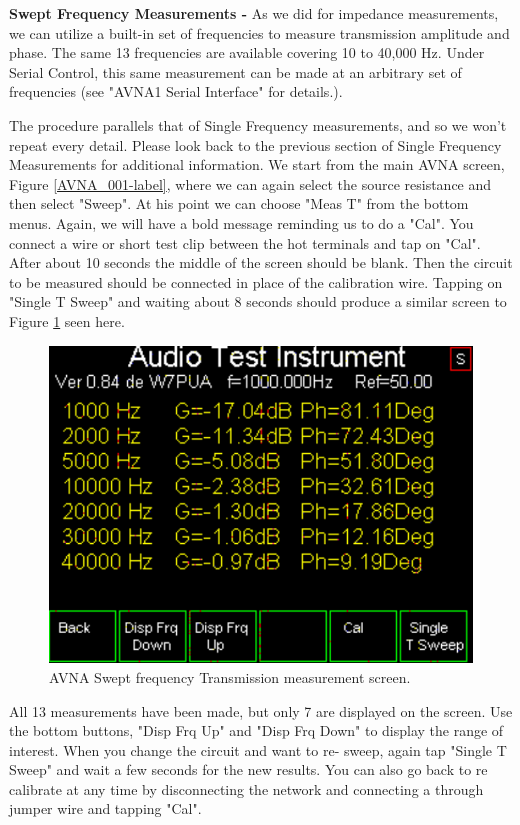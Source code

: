 \textbf{Swept Frequency Measurements - } As we did for impedance measurements, we can utilize a built-in set of frequencies to measure transmission amplitude and phase.  The same 13 frequencies are available covering 10 to 40,000 Hz.  Under Serial Control, this same measurement can be made at an arbitrary set of frequencies (see "AVNA1 Serial Interface" for details.).

The procedure parallels that of Single Frequency measurements, and so we won't repeat every detail.  Please look back to the previous section of Single Frequency Measurements for additional information.  We start from the main AVNA screen, Figure \ref{AVNA_001-label}, where we can again select the source resistance and then select "\textsf{Sweep}".  At his point we can choose "\textsf{Meas T}" from the bottom menus.  Again, we will have a bold message reminding us to do a "\textsf{Cal}".  You connect a wire or short test clip between the hot terminals and tap on "\textsf{Cal}".  After  about 10 seconds the middle of the screen should be blank. Then the circuit to be measured should be connected in place of the calibration wire.  Tapping on "\textsf{Single T Sweep}" and waiting about 8 seconds should produce a similar screen to Figure  \ref{AVNA_037-label} seen here.
\begin{figure}[H]
\begin{center}
\includegraphics[scale=0.75]{./images/AVNA_037.pdf}
\caption{AVNA Swept frequency Transmission measurement screen.}
\label{AVNA_037-label}
\end{center}
\end{figure}
%
All 13 measurements have been made, but only 7 are displayed on the screen.  Use the bottom buttons, "\textsf{Disp Frq Up}" and "\textsf{Disp Frq Down}" to display the range of interest.  When you change the circuit and want to re- sweep, again tap "\textsf{Single T Sweep}" and wait a few seconds for the new results.  You can also go back to re calibrate at any time by disconnecting the network and connecting a through jumper wire and tapping "\textsf{Cal}".

